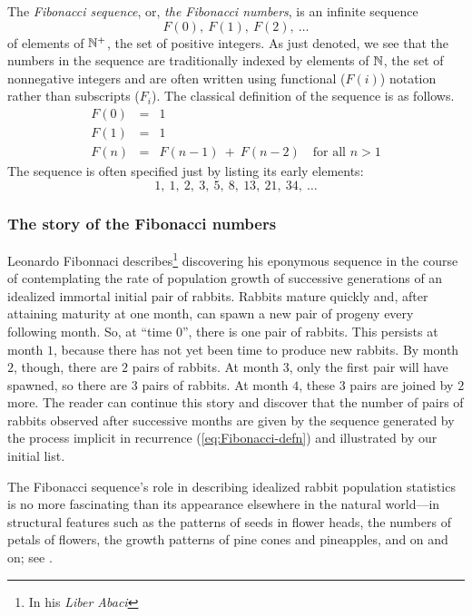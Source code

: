 The {\it Fibonacci sequence}, or, {\it the Fibonacci numbers}, is an
infinite sequence
\[ F(0), \ F(1), \ F(2), \ \ldots \]
of elements of $\mathbb{N}^+$, the set of positive integers.  As just denoted,
we see that the numbers in the sequence are traditionally indexed by
elements of $\mathbb{N}$, the set of nonnegative integers and are often
written using functional ($F(i)$) notation rather than subscripts
($F_i$).  The classical definition of the sequence is as follows.
\begin{eqnarray}
\nonumber
F(0) & = & 1 \\
\label{eq:Fibonacci-defn}
F(1) & = & 1 \\
\nonumber
F(n) & = & F(n-1) \ + \ F(n-2) \ \ \ \mbox{ for all } n > 1
\end{eqnarray}
The sequence is often specified just by listing its early elements:
\[ 1, \ 1, \ 2, \ 3, \ 5, \ 8, \ 13, \ 21, \ 34, \ \ldots \]


\subsubsection{The story of the Fibonacci numbers}
\label{sec:Fibonacci-story}

Leonardo Fibonnaci describes\footnote{In his {\it Liber Abaci}}
discovering his eponymous sequence in the course of contemplating the
rate of population growth of successive generations of an idealized
immortal initial pair of rabbits.  Rabbits mature quickly and, after
attaining maturity at one month, can spawn a new pair of progeny every
following month.  So, at ``time $0$'', there is one pair of rabbits.
This persists at month $1$, because there has not yet been time to
produce new rabbits.  By month $2$, though, there are $2$ pairs of
rabbits.  At month $3$, only the first pair will have spawned, so
there are $3$ pairs of rabbits.  At month $4$, these $3$ pairs are
joined by $2$ more.  The reader can continue this story and discover
that the number of pairs of rabbits observed after successive months
are given by the sequence generated by the process implicit in
recurrence (\ref{eq:Fibonacci-defn}) and illustrated by our initial
list.

The Fibonacci sequence's role in describing idealized rabbit
population statistics is no more fascinating than its appearance
elsewhere in the natural world---in structural features such as the
patterns of seeds in flower heads, the numbers of petals of flowers,
the growth patterns of pine cones and pineapples, and on and on; see
\cite{Basin63}.

